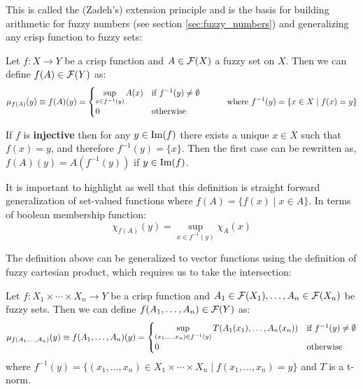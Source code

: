 This is called the (Zadeh's) extension principle and is the basis for building arithmetic for fuzzy numbers (see section \ref{sec:fuzzy_numbers}) and generalizing any crisp function to fuzzy sets: 

\begin{definition}
  Let $f: X \longrightarrow Y$ be a crisp function and $A\in \mathcal{F}(X)$ a fuzzy set on $X$. Then we can define $f(A)\in \mathcal{F}(Y)$ as:
  \[
  \mu_{f(A)}(y)\equiv f(A)(y) = 
  \begin{cases}
    \sup_{x\in f^{-1}(y)}A(x) & \textnormal{if } f^{-1}(y)\neq \emptyset\\
    0 & \textnormal{otherwise}
  \end{cases}
  \quad\quad\quad \textnormal{where } f^{-1}(y)=\{x\in X \mid f(x)=y\}
  \]
\end{definition}


\begin{remark}
  If $f$ is \textbf{injective} then for any $y \in \textnormal{Im}(f)$ there exists a unique $x \in X$ such that $f(x)=y$, and therefore $f^{-1}(y)=\{x\}$. Then the first case can be rewritten as, $f(A)(y) = A(f^{-1}(y))$ if $y \in \textnormal{Im}(f)$.
\end{remark}

It is important to highlight as well that this definition is straight forward generalization of set-valued functions where $f(A)= \{f(x)\mid x\in A\}$. In terms of boolean membership function:
$$\chi _{f(A)}(y)=\sup_{x\in f^{-1}(y)}\chi_A(x)$$

The definition above can be generalized to vector functions using the definition of fuzzy cartesian product, which requires us to take the intersection:

\begin{definition}
  Let $f: X_1 \times \cdots \times X_n \longrightarrow Y$ be a crisp function and $A_1 \in \mathcal{F}(X_1), \ldots, A_n \in \mathcal{F}(X_n)$ be fuzzy sets. Then we can define $f(A_1,\ldots,A_n)\in \mathcal{F}(Y)$ as:
  \[
  \mu_{f(A_1,\ldots,A_n)}(y)\equiv f(A_1,\ldots,A_n)(y) = 
  \begin{cases}
    \sup_{(x_1,\ldots,x_n)\in f^{-1}(y)} T(A_1(x_1),\ldots,A_n(x_n)) & \textnormal{if } f^{-1}(y)\neq \emptyset\\
    0 & \textnormal{otherwise}
  \end{cases}
  \]
  where $f^{-1}(y)=\{(x_1,\ldots,x_n)\in X_1\times\cdots\times X_n \mid f(x_1,\ldots,x_n)=y\}$ and $T$ is a t-norm.
\end{definition}

